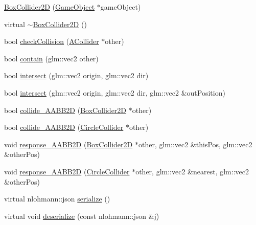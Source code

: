 \begin{DoxyCompactItemize}
\item 
\mbox{\hyperlink{class_beer_engine_1_1_component_1_1_box_collider2_d_a8b3e9562b1b4fdf9f6444b47c10ffa93}{Box\+Collider2D}} (\mbox{\hyperlink{class_beer_engine_1_1_game_object}{Game\+Object}} $\ast$game\+Object)
\item 
virtual \mbox{\hyperlink{class_beer_engine_1_1_component_1_1_box_collider2_d_a56c4a94ddb75c8f455aacd79a2bed429}{$\sim$\+Box\+Collider2D}} ()
\item 
bool \mbox{\hyperlink{class_beer_engine_1_1_component_1_1_box_collider2_d_aeaac56770926a57af78e7af0379c30ca}{check\+Collision}} (\mbox{\hyperlink{class_beer_engine_1_1_component_1_1_a_collider}{A\+Collider}} $\ast$other)
\item 
bool \mbox{\hyperlink{class_beer_engine_1_1_component_1_1_box_collider2_d_a7147a553f4200c6cf4031af2ddb70154}{contain}} (glm\+::vec2 other)
\item 
bool \mbox{\hyperlink{class_beer_engine_1_1_component_1_1_box_collider2_d_a6ebe330aba3bb7f8f7a84686b0717e5d}{intersect}} (glm\+::vec2 origin, glm\+::vec2 dir)
\item 
bool \mbox{\hyperlink{class_beer_engine_1_1_component_1_1_box_collider2_d_a41f84de78c4441ec2c74a0d3609f2c09}{intersect}} (glm\+::vec2 origin, glm\+::vec2 dir, glm\+::vec2 \&out\+Position)
\item 
bool \mbox{\hyperlink{class_beer_engine_1_1_component_1_1_box_collider2_d_a2b6af1325c64867d59cb11655c41a262}{collide\+\_\+\+A\+A\+B\+B2D}} (\mbox{\hyperlink{class_beer_engine_1_1_component_1_1_box_collider2_d}{Box\+Collider2D}} $\ast$other)
\item 
bool \mbox{\hyperlink{class_beer_engine_1_1_component_1_1_box_collider2_d_a36f2e8987bd65106250ca6eea7003e1b}{collide\+\_\+\+A\+A\+B\+B2D}} (\mbox{\hyperlink{class_beer_engine_1_1_component_1_1_circle_collider}{Circle\+Collider}} $\ast$other)
\item 
void \mbox{\hyperlink{class_beer_engine_1_1_component_1_1_box_collider2_d_ab10c2db9816e643482ed59d35b0cff69}{response\+\_\+\+A\+A\+B\+B2D}} (\mbox{\hyperlink{class_beer_engine_1_1_component_1_1_box_collider2_d}{Box\+Collider2D}} $\ast$other, glm\+::vec2 \&this\+Pos, glm\+::vec2 \&other\+Pos)
\item 
void \mbox{\hyperlink{class_beer_engine_1_1_component_1_1_box_collider2_d_a5acb3137ff57c6511993f57c54b405b3}{response\+\_\+\+A\+A\+B\+B2D}} (\mbox{\hyperlink{class_beer_engine_1_1_component_1_1_circle_collider}{Circle\+Collider}} $\ast$other, glm\+::vec2 \&nearest, glm\+::vec2 \&other\+Pos)
\item 
virtual nlohmann\+::json \mbox{\hyperlink{class_beer_engine_1_1_component_1_1_box_collider2_d_a9172319becb9c609206265378ad04724}{serialize}} ()
\item 
virtual void \mbox{\hyperlink{class_beer_engine_1_1_component_1_1_box_collider2_d_ab7de4fc1ab97576308f9f5bb76098a54}{deserialize}} (const nlohmann\+::json \&j)
\end{DoxyCompactItemize}
